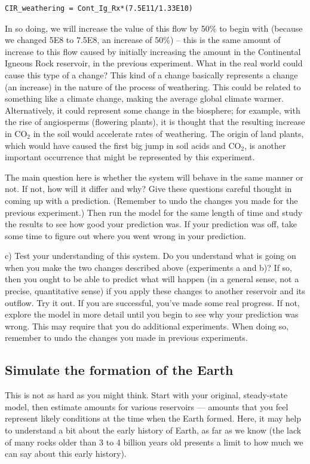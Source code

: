 \documentclass[11pt,letterpaper]{article}
\begin{document}
\begin{verbatim}
CIR_weathering = Cont_Ig_Rx*(7.5E11/1.33E10)
\end{verbatim}

In so doing, we will increase the value of this flow by 50\% to begin with (because we changed 5E8 to 7.5E8, an increase of 50\%) -- this is the same amount of increase to this flow caused by initially increasing the amount in the Continental Igneous Rock reservoir, in the previous experiment. What in the real world could cause this type of a change? This kind of a change basically represents a change (an increase) in the nature of the process of weathering. This could be related to something like a climate change, making the average global climate warmer. Alternatively, it could represent some change in the biosphere; for example, with the rise of angiosperms (flowering plants), it is thought that the resulting increase in CO$_2$ in the soil would accelerate rates of weathering. The origin of land plants, which would have caused the first big jump in soil acids and CO$_2$, is another important occurrence that might be represented by this experiment.

The main question here is whether the system will behave in the same manner or not. If not, how will it differ and why? Give these questions careful thought in coming up with a prediction. (Remember to undo the changes you made for the previous experiment.) Then run the model for the same length of time and study the results to see how good your prediction was. If your prediction was off, take some time to figure out where you went wrong in your prediction.
\bigskip 

c) Test your understanding of this system. Do you understand what is going on when you make the two changes described above (experiments a and b)? If so, then you ought to be able to predict what will happen (in a general sense, not a precise, quantitative sense) if you apply these changes to another reservoir and its outflow. Try it out. If you are successful, you've made some real progress. If not, explore the model in more detail until you begin to see why your prediction was wrong. This may require that you do additional experiments. When doing so, remember to undo the
changes you made in previous experiments.

\subsection{Simulate the formation of the Earth}
This is not as hard as you might think. Start with your original, steady-state model, then estimate amounts for various reservoirs --- amounts that you feel represent likely conditions at the time when the Earth formed. Here, it may help to understand a bit about the early history of Earth, as far as we know (the lack of many rocks older than 3 to 4 billion years old presents a limit to how much we can say about this early history).
\end{document}
